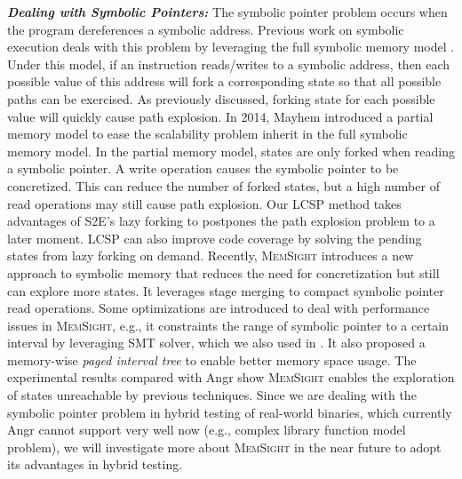 \noindent\textit{\textbf{Dealing with Symbolic Pointers:}}
The symbolic pointer problem occurs when the program dereferences a symbolic address. 
 Previous work on symbolic execution deals with this problem by leveraging the full symbolic memory model \cite{song2008bitblaze, thakur2010directed, brumley2011bap, trtik2014symbolic}. Under this model, if an instruction reads/writes to a symbolic address, then each possible value of this address will fork a corresponding state so that all possible paths can be exercised.
  As previously discussed, forking state for each possible value will quickly cause path explosion. 
 In 2014, Mayhem \cite{cha2012unleashing} introduced a partial memory model to ease the scalability problem inherit in the full symbolic memory model. 
  In the partial memory model, states are only forked when reading a symbolic pointer.
  A write operation causes the symbolic pointer to be concretized.
  This can reduce the number of forked states, but a high number of read operations may still cause path explosion.
 Our LCSP method takes advantages of S2E's lazy forking to postpones the path explosion problem to a later moment. 
  LCSP can also improve code coverage by solving the pending states from lazy forking on demand.
  Recently, \textsc{MemSight} \cite{Coppa:2017:RPR:3155562.3155638} introduces a new approach 
  to symbolic memory that reduces the need for concretization but still can explore more states.
  It leverages stage merging \cite{Avgerinos:2014:ESE:2568225.2568293} to compact symbolic 
  pointer read operations. Some optimizations are introduced to deal with performance issues
  in \textsc{MemSight}, e.g., it constraints the range of symbolic pointer to a certain interval by leveraging SMT solver, which we also used in \prototype. It also proposed  a
  memory-wise \emph{paged interval tree} to enable better memory space usage. The experimental
  results compared with Angr show \textsc{MemSight} enables the exploration
  of states unreachable by previous techniques. Since we are dealing with the symbolic pointer
  problem in hybrid testing of real-world binaries, which currently Angr cannot support very
  well now (e.g., complex library function model problem), we will investigate more about \textsc{MemSight} in the near future to adopt its advantages in hybrid testing.
  

